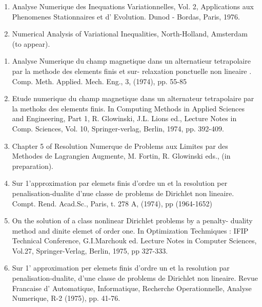 \begin{thebibliography}{99}
\begin{enumerate}
  \item  Analyse Numerique des Inequations Variationnelles, Vol. 2,
 Applications aux Phenomenes Stationnaires et d' Evolution. Dunod -
 Bordas, Paris, 1976.\label{k53:e2}  

  \item Numerical Analysis of Variational Inequalities, North-Holland,
 Amsterdam (to appear).\label{k53:e3} 
  \end{enumerate}


  \begin{enumerate}
  \item  Analyse Numerique du champ magnetique dans un alternatieur
 tetrapolaire par la methode des elements finis et sur- relaxation
 ponctuelle non lineaire . Comp. Meth. Applied. Mech. Eng., 3,
 (1974), pp. 55-85\label{k54:e1} 

  \item Etude numerique du champ magnetique dans un alternateur
 tetrapolaire par la methoks des elements finis. In Computing
 Methods in Applied Sciences and Engineering, Part 1, R. Glowinski,
 J.L. Lions ed., Lecture Notes in Comp. Sciences, Vol. 10,
 Springer-verlag, Berlin, 1974, pp. 392-409.\label{k54:e2} 

  \item Chapter 5 of Resolution Numerque de Problems aux Limites par
 des Methodes de Lagrangien Augmente, M. Fortin, R. Glowinski eds.,
 (in preparation).\label{k54:e3} 

  \item Sur 1'\pageoriginale approximation par elemets finis d'ordre un et la
 resolution per penalisation-dualite d'nue classe de problems de
 Dirichlet non lineaire. Compt. Rend. Acad.Sc., Paris, t. 278 A,
 (1974), pp (1964-1652)\label{k54:e4} 

  \item On the solution of a class nonlinear Dirichlet problems by a
 penalty- duality method and dinite elemet of order one. In
 Optimization Techmiques : IFIP Technical Conference, G.I.Marchouk
 ed. Lecture Notes in Computer Sciences, Vol.27, Springer-Verlag,
 Berlin, 1975, pp 327-333.\label{k54:e5} 

  \item Sur 1' approximation per elemets finis d'ordre un et la
 resolution par penalisation-dualite, d'une classe de problems de
 Dirichlet non lineaire. Revue Francaise d' Automatique,
 Informatique, Recherche  Operationnelle, Analyse Numerique, R-2
 (1975), pp. 41-76.\label{k54:e6} 


\end{enumerate}
\end{thebibliography}
